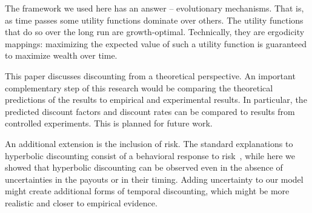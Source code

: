 \documentclass[11pt]{article}
\numberwithin{equation}{section}
\begin{document}
The framework we used here has an answer -- evolutionary mechanisms. That is, as time passes some utility functions dominate over others. The utility functions that do so over the long run are growth-optimal. Technically, they are ergodicity mappings: maximizing the expected value of such a utility function is guaranteed to maximize wealth over time.

This paper discusses discounting from a theoretical perspective. An important complementary step of this research would be comparing the theoretical predictions of the results to empirical and experimental results. In particular, the predicted discount factors and discount rates can be compared to results from controlled experiments. This is planned for future work.

An additional extension is the inclusion of risk. The standard explanations to hyperbolic discounting consist of a behavioral response to risk~\citep{sozou1998hyperbolic,dasgupta2005uncertainty}, while here we showed that hyperbolic discounting can be observed even in the absence of uncertainties in the payouts or in their timing. Adding uncertainty to our model might create additional forms of temporal discounting, which might be more realistic and closer to empirical evidence.



\end{document}

